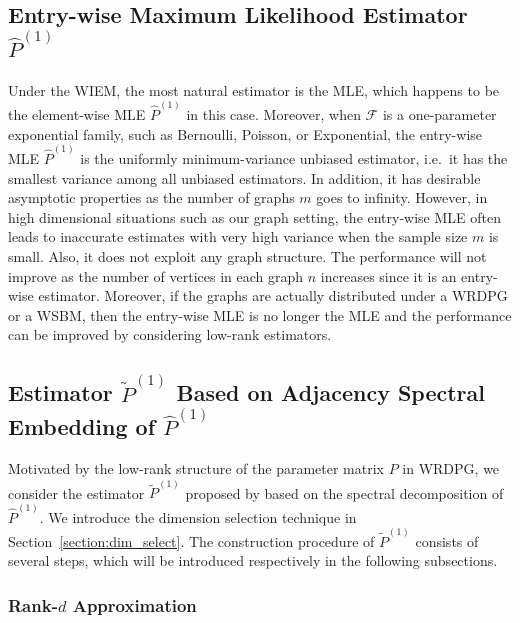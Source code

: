 \documentclass[a4paper]{article}
\renewcommand{\hat}{\widehat}
\begin{document}
\subsection{Entry-wise Maximum Likelihood Estimator $\hat{P}^{(1)}$}

Under the WIEM, the most natural estimator is the MLE, which happens to be the element-wise MLE $\hat{P}^{(1)}$ in this case.
Moreover, when $\mathcal{F}$ is a one-parameter exponential family, such as Bernoulli, Poisson, or Exponential, the entry-wise MLE $\hat{P}^{(1)}$ is the uniformly minimum-variance unbiased estimator, i.e.\ it has the smallest variance among all unbiased estimators. In addition, it has desirable asymptotic properties as the number of graphs $m$ goes to infinity.
However, in high dimensional situations such as our graph setting, the entry-wise MLE often leads to inaccurate estimates with very high variance when the sample size $m$ is small. Also, it does not exploit any graph structure. The performance will not improve as the number of vertices in each graph $n$ increases since it is an entry-wise estimator. Moreover, if the graphs are actually distributed under a WRDPG or a WSBM, then the entry-wise MLE is no longer the MLE  and the performance can be improved by considering low-rank estimators.


\subsection{Estimator $\widetilde{P}^{(1)}$ Based on Adjacency Spectral Embedding of $\hat{P}^{(1)}$}

Motivated by the low-rank structure of the parameter matrix $P$ in WRDPG, we consider the estimator $\widetilde{P}^{(1)}$ proposed by \citet{tang2016law} based on the spectral decomposition of $\hat{P}^{(1)}$.
We introduce the dimension selection technique in Section~\ref{section:dim_select}.
The construction procedure of $\widetilde{P}^{(1)}$ consists of several steps, which will be introduced respectively in the following subsections.

\subsubsection{Rank-$d$ Approximation}
\end{document}
